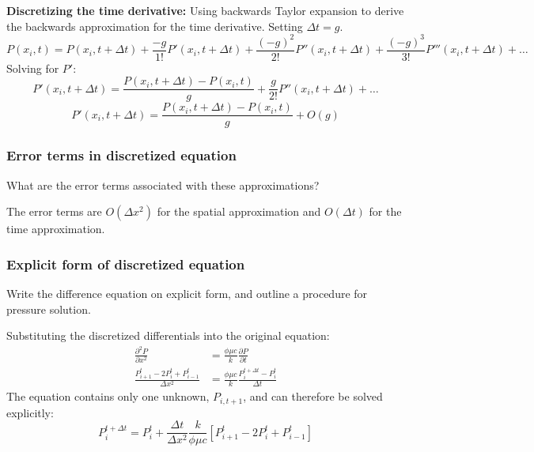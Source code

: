 \textbf{Discretizing the time derivative:}
Using backwards Taylor expansion to derive the backwards approximation for the time derivative. Setting $\Delta t = g$.
\begin{equation}
  P(x_{i},t)=P(x_{i},t+\Delta t)+\frac{-g}{1!}P'(x_{i},t+\Delta t)+\frac{(-g)^{2}}{2!}P''(x_{i},t+\Delta t)+\frac{(-g)^{3}}{3!}P'''(x_{i},t+\Delta t)+\dots \nonumber
\end{equation}
Solving for $P'$:
\begin{equation}
  P'(x_{i},t+\Delta t)=\frac{P(x_{i},t+\Delta t)-P(x_{i},t)}{g}+\frac{g}{2!}P''(x_{i},t+\Delta t)+\dots \nonumber
\end{equation}
\begin{equation}
  P'(x_{i},t+\Delta t)=\frac{P(x_{i},t+\Delta t)-P(x_{i},t)}{g}+O\left(g\right)
\end{equation}

\subsubsection{Error terms in discretized equation} %
\label{ssub:error_terms_in_discretized_equation}
\begin{question}
  What are the error terms associated with these approximations?
\end{question}

The error terms are $O(\Delta x^2)$ for the spatial approximation and $O(\Delta t)$ for the time approximation.

\subsubsection{Explicit form of discretized equation} %
\label{ssub:explicit_form_of_discretized_equation}

\begin{question}
  Write the difference equation on explicit form, and outline a procedure for pressure solution.
\end{question}

Substituting the discretized differentials into the original equation:
\begin{align}
  \nonumber
  \frac{\partial^{2}P}{\partial x^{2}} &= \frac{\phi \mu c}{k}\frac{\partial P}{\partial t} \\
  \nonumber
  \frac{P_{i+1}^{t}-2P_{i}^{t}+P_{i-1}^{t}}{\Delta x^{2}}
  &=\frac{\phi\mu c}{k}\frac{P_{i}^{t+\Delta t}-P_{i}^{t}}{\Delta t}
\end{align}
The equation contains only one unknown, $P_{i,t+1}$, and can therefore be solved explicitly:
\begin{equation}
  P_{i}^{t+\Delta t}=P_{i}^{t}+\frac{\Delta t}{\Delta x^{2}}\frac{k}{\phi\mu c}\left[P_{i+1}^{t}-2P_{i}^{t}+P_{i-1}^{t}\right]
\end{equation}

